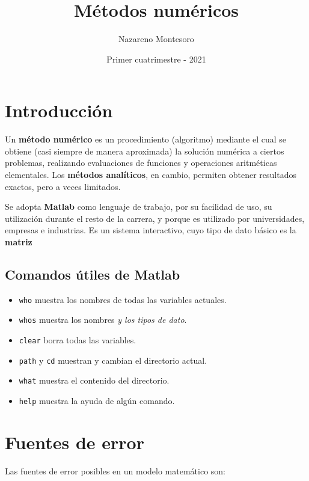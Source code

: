\documentclass{article}
\title{Métodos numéricos}
\author{Nazareno Montesoro}
\date{Primer cuatrimestre - 2021}
\begin{document}
\maketitle

\section{Introducción}

Un \textbf{método numérico} es un procedimiento (algoritmo) mediante el cual se
obtiene (casi siempre de manera aproximada) la solución numérica a ciertos
problemas, realizando evaluaciones de funciones y operaciones aritméticas
elementales. Los \textbf{métodos analíticos}, en cambio, permiten obtener
resultados exactos, pero a veces limitados.

Se adopta \textbf{Matlab} como lenguaje de trabajo, por su facilidad de uso,
su utilización durante el resto de la carrera, y porque es utilizado por
universidades, empresas e industrias. Es un sistema interactivo, cuyo tipo de 
dato básico es la \textbf{matriz}

\subsection{Comandos útiles de Matlab}

\begin{itemize}
    \item \verb|who| muestra los nombres de todas las variables actuales.
    \item \verb|whos| muestra los nombres \textit{y los tipos de dato}.
    \item \verb|clear| borra todas las variables.
    \item \verb|path| y \verb|cd| muestran y cambian el directorio actual.
    \item \verb|what| muestra el contenido del directorio.
    \item \verb|help| muestra la ayuda de algún comando.
\end{itemize}

\section{Fuentes de error}

Las fuentes de error posibles en un modelo matemático son:
\end{document}
